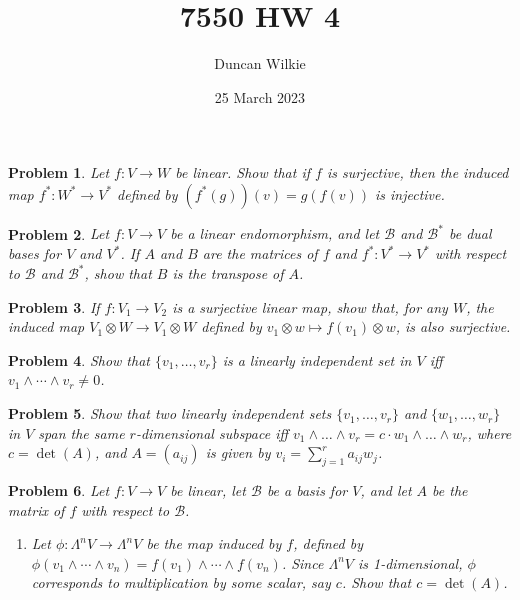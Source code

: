 \documentclass{article}
\title{7550 HW 4}
\author{Duncan Wilkie}
\date{25 March 2023}
\newtheorem{plm}{Problem}
\begin{document}
\maketitle

\begin{plm}
  Let $f: V \to W$ be linear.
  Show that if $f$ is surjective, then the induced map $f^{*}: W^{*} \to V^{*}$ defined by $(f^{*}(g))(v) = g(f(v))$ is injective.
\end{plm}

\begin{plm}
  Let $f: V \to V$ be a linear endomorphism, and let $\mathcal{B}$ and $\mathcal{B}^{*}$ be dual bases for $V$ and $V^{*}$.
  If $A$ and $B$ are the matrices of $f$ and $f^{*}: V^{*} \to V^{*}$ with respect to $\mathcal{B}$ and $\mathcal{B}^{*}$,
  show that $B$ is the transpose of $A$.
\end{plm}

\begin{plm}
  If $f: V_{1} \to V_{2}$ is a surjective linear map, show that, for any $W$, the induced map $V_{1} \otimes W \to V_{1} \otimes W$
  defined by $v_{1} \otimes w \mapsto f(v_{1}) \otimes w$, is also surjective.
\end{plm}

\begin{plm}
  Show that $\{v_{1}, \ldots, v_{r}\}$ is a linearly independent set in $V$ iff $v_{1} \land \cdots \land v_{r} \neq 0$.
\end{plm}

\begin{plm}
  Show that two linearly independent sets $\{v_{1}, \ldots, v_{r}\}$ and $\{w_{1}, \ldots, w_{r}\}$ in $V$
  span the same $r$-dimensional subspace iff $v_{1} \land \ldots \land v_{r}= c \cdot w_{1} \land \ldots \land w_{r}$,
  where $c = \det(A)$, and $A = (a_{ij})$ is given by $v_{i} = \sum_{j = 1}^{r}a_{ij}w_{j}$.
\end{plm}

\begin{plm}
  Let $f: V \to V$ be linear, let $\mathcal{B}$ be a basis for $V$, and let $A$ be the matrix of $f$ with respect to $\mathcal{B}$.
  \begin{enumerate}
  \item Let $\phi: \Lambda^{n}V \to \Lambda^{n}V$ be the map induced by $f$, defined by
    $\phi(v_{1} \land \cdots \land v_{n}) = f(v_{1}) \land \cdots \land f(v_{n})$.
    Since $\Lambda^{n}V$ is 1-dimensional, $\phi$ corresponds to multiplication by some scalar, say $c$.
    Show that $c = \det(A)$.
  \end{enumerate}
\end{plm}
\end{document}

